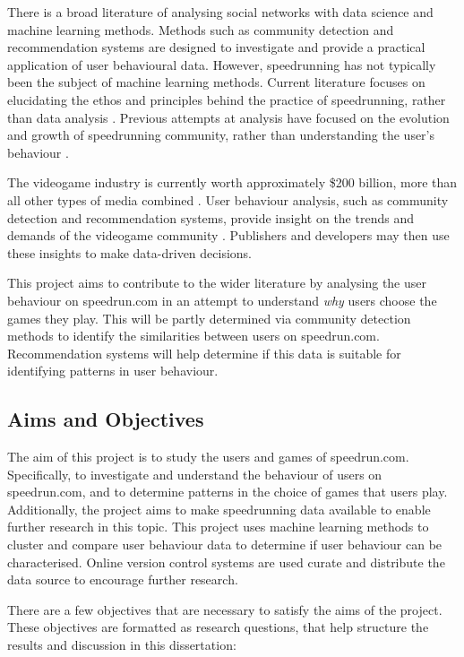 There is a broad literature of analysing social networks with data science and machine learning methods. Methods such as community detection and recommendation systems are designed to investigate and provide a practical application of user behavioural data. However, speedrunning has not typically been the subject of machine learning methods. Current literature focuses on elucidating the ethos and principles behind the practice of speedrunning, rather than data analysis \cite{Hemmingsen, ScullyBlaker, EscobarLamanna}. Previous attempts at analysis have focused on the evolution and growth of speedrunning community, rather than understanding the user's behaviour \cite{OrtizSanchez}.


The videogame industry is currently worth approximately \$200 billion, more than all other types of media combined \cite{pwc_outlook}. User behaviour analysis, such as community detection and recommendation systems, provide insight on the trends and demands of the videogame community \cite{Tang2010CommunityDA}. Publishers and developers may then use these insights to make data-driven decisions.


This project aims to contribute to the wider literature by analysing the user behaviour on speedrun.com in an attempt to understand \textit{why} users choose the games they play. This will be partly determined via community detection methods to identify the similarities between users on speedrun.com. Recommendation systems will help determine if this data is suitable for identifying patterns in user behaviour.

\subsection{Aims and Objectives}

The aim of this project is to study the users and games of speedrun.com. Specifically, to investigate and understand the behaviour of users on speedrun.com, and to determine patterns in the choice of games that users play. Additionally, the project aims to make speedrunning data available to enable further research in this topic. This project uses machine learning methods to cluster and compare user behaviour data to determine if user behaviour can be characterised. Online version control systems are used curate and distribute the data source to encourage further research.


There are a few objectives that are necessary to satisfy the aims of the project. These objectives are formatted as research questions, that help structure the results and discussion in this dissertation:

